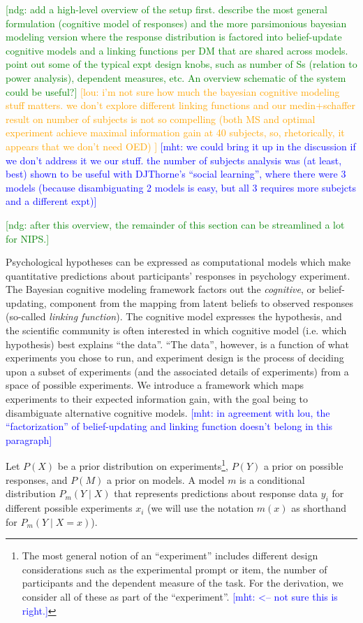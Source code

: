 \documentclass{article}
\newcommand{\ndg}[1]{\textcolor{Green}{[ndg: #1]}}
\newcommand{\mht}[1]{\textcolor{Blue}{[mht: #1]}}
\newcommand{\lou}[1]{\textcolor{orange}{[lou: #1]}}
\begin{document}
\ndg{add a high-level overview of the setup first. describe the most general formulation (cognitive model of responses) and the more parsimonious bayesian modeling version where the response distribution is factored into belief-update cognitive models and a linking functions per DM that are shared across models.  point out some of the typical expt design knobs, such as number of Ss (relation to power analysis), dependent measures, etc. An overview schematic of the system could be useful?}
\lou{i'm not sure how much the bayesian cognitive modeling stuff matters. we don't explore different linking functions and our medin+schaffer result on number of subjects is not so compelling (both MS and optimal experiment achieve maximal information gain at 40 subjects, so, rhetorically, it appears that we don't need OED) }
\mht{we could bring it up in the discussion if we don't address it we our stuff.  the number of subjects analysis was (at least, best) shown to be useful with DJThorne's ``social learning'', where there were 3 models (because disambiguating 2 models is easy, but all 3 requires more subejcts and a different expt)}

\ndg{after this overview, the remainder of this section can be streamlined a lot for NIPS.}

Psychological hypotheses can be expressed as computational models which make quantitative predictions about participants' responses in psychology experiment.
The Bayesian cognitive modeling framework factors out the \emph{cognitive}, or belief-updating, component from the mapping from latent beliefs to observed responses (so-called \emph{linking function}).
The cognitive model expresses the hypothesis, and the scientific community is often interested in which cognitive model (i.e. which hypothesis) best explains ``the data''.
``The data'', however, is a function of what experiments you chose to run, and experiment design is the process of deciding upon a subset of experiments (and the associated details of experiments) from a space of possible experiments.
We introduce a framework which maps experiments to their expected information gain, with the goal being to disambiguate alternative cognitive models.
\mht{in agreement with lou, the ``factorization'' of belief-updating and linking function doesn't belong in this paragraph}

Let $P(X)$ be a prior distribution on experiments\footnote{
The most general notion of an ``experiment'' includes different design considerations such as the experimental prompt or item, the number of participants and the dependent measure of the task.  For the derivation, we consider all of these as part of the ``experiment''. \mht{<-- not sure this is right.}
}, $P(Y)$ a prior on possible responses, and $P(M)$ a prior on models.
A model $m$ is a conditional distribution $P_m(Y \mid X)$ that represents predictions about response data $y_i$ for different possible experiments $x_i$ (we will use the notation $m(x)$ as shorthand for $P_m(Y \mid X = x)$).
\end{document}
